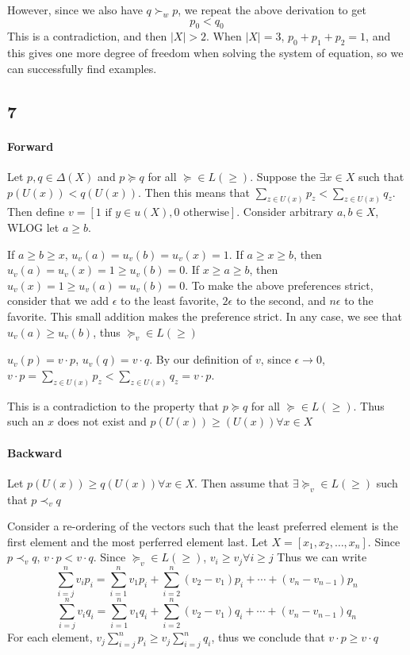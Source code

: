 \documentclass[12pt]{article}
\begin{document}
However, since we also have $q \succ_w p$, we repeat the above derivation to get 
\[p_0 < q_0\]
This is a contradiction, and then $|X|>2$. When $|X|=3$, $p_0+p_1+p_2=1$, and 
this gives one more degree of freedom when solving the system of equation, so we 
can successfully find examples. 
\newpage


\subsection*{7}

\paragraph*{Forward}
Let $p, q \in \Delta(X)$ and $p \succeq q$ for all $\succeq \in L(\geq)$. Suppose the $\exists x \in X$ 
such that $p(U(x))<q(U(x))$. Then this means that $\sum_{z \in U(x)}p_z < \sum_{z \in U(x)}q_z$. Then define 
$v = [1 \text{ if $y \in u(X)$}, 0 \text{ otherwise}]$.
Consider arbitrary $a, b \in X$, WLOG let $a \geq b$. 

If $a \geq b \geq x$, $u_v(a)=u_v(b)=u_v(x)=1$.
If $a \geq x \geq b$, then $u_v(a) = u_v(x) = 1 \geq u_v(b) = 0$. If $x \geq a \geq b$, then 
$u_v(x) = 1 \geq u_v(a) = u_v(b) = 0$. 
To make the above preferences strict, consider that we add $\epsilon$ to the least favorite, 
$2 \epsilon$ to the second, and $n \epsilon$ to the favorite. This small addition makes the preference strict.
In any case, we see that $u_v(a) \geq u_v(b)$, thus $\succeq_v \in L(\geq)$


$u_v(p) = v \cdot p$, $u_v(q) = v \cdot q$. By our definition of $v$, since $\epsilon \to 0$,  
$v \cdot p = \sum_{z \in U(x)}p_z <  \sum_{z \in U(x)}q_z = v \cdot p$. 

This is a contradiction to the property that $p \succeq q$ for all $\succeq \in L(\geq)$. Thus such an 
$x$ does not exist and $p(U(x))\geq(U(x)) \forall x \in X$


\paragraph*{Backward}
Let $p(U(x)) \geq q(U(x)) \forall x \in X$. Then assume that $\exists \succeq_v \in L(\geq)$ such that 
$p \prec_v q$

Consider a re-ordering of the vectors such that the least preferred element is the first element and the 
most perferred element last. Let $X = [x_1, x_2, \ldots, x_n]$. Since $p \prec_v q$, $v \cdot p < v \cdot q$.
Since $\succeq_v \in L(\geq)$, $v_i \geq v_j \forall i \geq j$
Thus we can write
\[\sum_{i=j}^n v_i p_i = \sum_{i=1}^n v_1 p_i + \sum_{i=2}^n (v_2-v_1) p_i + \cdots + (v_n-v_{n-1})p_n\]
\[\sum_{i=j}^n v_i q_i = \sum_{i=1}^n v_1 q_i + \sum_{i=2}^n (v_2-v_1) q_i + \cdots + (v_n-v_{n-1})q_n\]
For each element, $v_j\sum_{i=j}^n p_i \geq v_j\sum_{i=j}^n q_i$, thus we conclude that 
$v \cdot p \geq v \cdot q$
\end{document}
